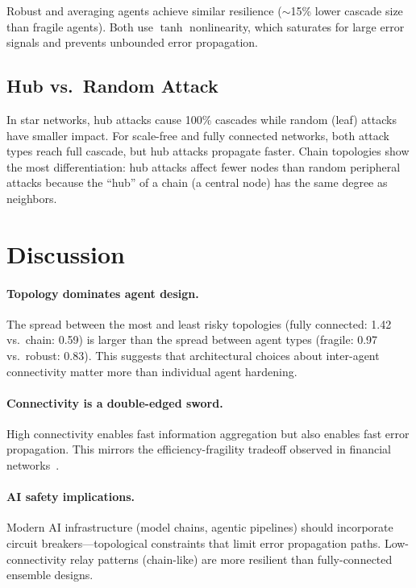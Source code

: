 \documentclass[11pt]{article}
\begin{document}
Robust and averaging agents achieve similar resilience ($\sim$15\% lower cascade size than fragile agents).
Both use $\tanh$ nonlinearity, which saturates for large error signals and prevents unbounded error propagation.

\subsection{Hub vs.\ Random Attack}

In star networks, hub attacks cause 100\% cascades while random (leaf) attacks have smaller impact.
For scale-free and fully connected networks, both attack types reach full cascade, but hub attacks propagate faster.
Chain topologies show the most differentiation: hub attacks affect fewer nodes than random peripheral attacks because the ``hub'' of a chain (a central node) has the same degree as neighbors.

\section{Discussion}

\paragraph{Topology dominates agent design.}
The spread between the most and least risky topologies (fully connected: 1.42 vs.\ chain: 0.59) is larger than the spread between agent types (fragile: 0.97 vs.\ robust: 0.83).
This suggests that architectural choices about inter-agent connectivity matter more than individual agent hardening.

\paragraph{Connectivity is a double-edged sword.}
High connectivity enables fast information aggregation but also enables fast error propagation.
This mirrors the efficiency-fragility tradeoff observed in financial networks~\cite{acemoglu2015}.

\paragraph{AI safety implications.}
Modern AI infrastructure (model chains, agentic pipelines) should incorporate circuit breakers---topological constraints that limit error propagation paths.
Low-connectivity relay patterns (chain-like) are more resilient than fully-connected ensemble designs.
\end{document}
